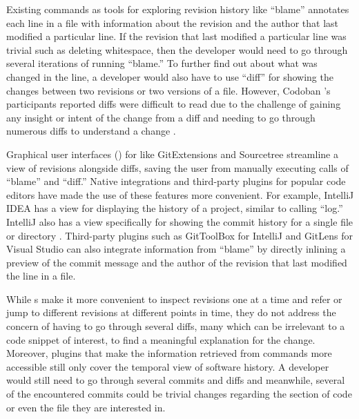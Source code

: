 Existing  commands as tools for exploring revision history like ``blame'' \cite{gitblame} annotates each line in a file with information about the revision and the author that last modified a particular line.
If the revision that last modified a particular line was trivial such as deleting whitespace, then the developer would need to go through several iterations of running ``blame.''
To further find out about what was changed in the line, a developer would also have to use  ``diff'' \cite{gitdiff} for showing the changes between two revisions or two versions of a file.
However, Codoban \etal's participants reported diffs were difficult to read due to the challenge of gaining any insight or intent of the change from a diff and needing to go through numerous diffs to understand a change \cite{codoban_software_2015}.

Graphical user interfaces () for  like GitExtensions \cite{gitextensions} and Sourcetree \cite{sourcetree} streamline a view of revisions alongside diffs, saving the user from manually executing calls of  ``blame'' and ``diff.'' 
Native  integrations and third-party plugins for popular code editors have made the use of these  features more convenient. 
For example, IntelliJ IDEA \cite{intellij} has a view for displaying the  history of a project, similar to calling  ``log.''
IntelliJ also has a view specifically for showing the commit history for a single file or directory \cite{intellij-showhistory}.
Third-party plugins such as GitToolBox for IntelliJ and GitLens for Visual Studio can also integrate information from  ``blame'' by directly inlining a preview of the commit message and the author of the revision that last modified the line in a file.

While s make it more convenient to inspect revisions one at a time and refer or jump to different revisions at different points in time, they do not address the concern of having to go through several diffs, many which can be irrelevant to a code snippet of interest, to find a meaningful explanation for the change.
Moreover, plugins that make the information retrieved from  commands more accessible still only cover the temporal view of software history.
A developer would still need to go through several commits and diffs and meanwhile, several of the encountered commits could be trivial changes regarding the section of code or even the file they are interested in.

